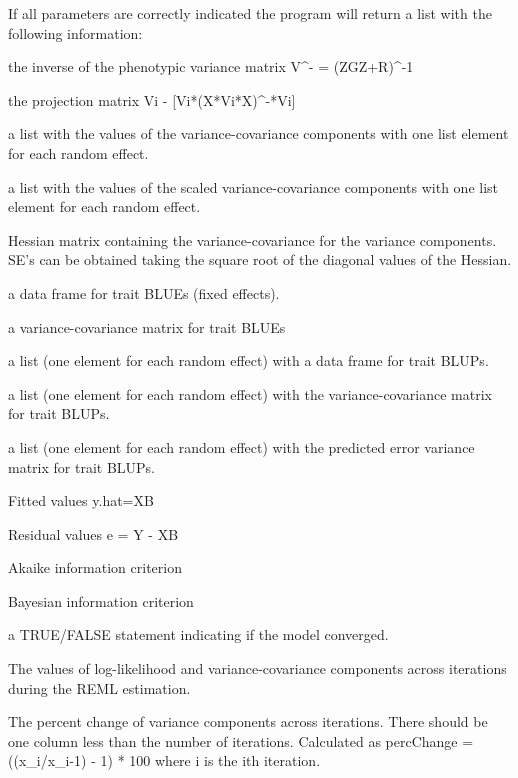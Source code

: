 \documentclass[a4paper]{book}
\begin{document}
\begin{Value}
If all parameters are correctly indicated the program will return a list with the following information:

\begin{ldescription}
\item[\code{Vi}] the inverse of the phenotypic variance matrix V\textasciicircum{}- = (ZGZ+R)\textasciicircum{}-1
\item[\code{P}] the projection matrix  Vi - [Vi*(X*Vi*X)\textasciicircum{}-*Vi] 
\item[\code{sigma}] a list with the values of the variance-covariance components with one list element for each random effect.
\item[\code{sigma\_scaled}] a list with the values of the scaled variance-covariance components with one list element for each random effect.
\item[\code{sigmaSE}] Hessian matrix containing the variance-covariance for the variance components. SE's can be obtained taking the square root of the diagonal values of the Hessian.
\item[\code{Beta}] a data frame for trait BLUEs (fixed effects).
\item[\code{VarBeta}] a variance-covariance matrix for trait BLUEs
\item[\code{U}] a list (one element for each random effect) with a data frame for trait BLUPs.
\item[\code{VarU}] a list (one element for each random effect) with the variance-covariance matrix for trait BLUPs.
\item[\code{PevU}] a list (one element for each random effect) with the predicted error variance matrix for trait BLUPs.
\item[\code{fitted}]  Fitted values y.hat=XB
\item[\code{residuals}] Residual values e = Y - XB
\item[\code{AIC}] Akaike information criterion
\item[\code{BIC}] Bayesian information criterion
\item[\code{convergence}] a TRUE/FALSE statement indicating if the model converged.
\item[\code{monitor}] The values of log-likelihood and variance-covariance components across iterations during the REML estimation.
\item[\code{percChange}] The percent change of variance components across iterations. There should be one column less than the number of iterations. Calculated as percChange = ((x\_i/x\_i-1) - 1) * 100 where i is the ith iteration.

\end{ldescription}
\end{Value}
\end{document}

